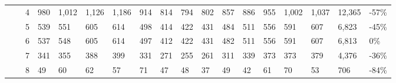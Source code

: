 \begin{longtable}{llllllllllllllllll}
   &  & 4 & 980 & 1,012 & 1,126 & 1,186 & 914 & 814 & 794 & 802 & 857 & 886 & 955 & 1,002 & 1,037 & 12,365 & -57\% \\ 
   &  & 5 & 539 & 551 & 605 & 614 & 498 & 414 & 422 & 431 & 484 & 511 & 556 & 591 & 607 & 6,823 & -45\% \\ 
   &  & 6 & 537 & 548 & 605 & 614 & 497 & 412 & 422 & 431 & 482 & 511 & 556 & 591 & 607 & 6,813 & 0\% \\ 
   &  & 7 & 341 & 355 & 388 & 399 & 331 & 271 & 255 & 261 & 311 & 339 & 373 & 373 & 379 & 4,376 & -36\% \\ 
   &  & 8 & 49 & 60 & 62 & 57 & 71 & 47 & 48 & 37 & 49 & 42 & 61 & 70 & 53 & 706 & -84\% \\ 
  \hline
\end{longtable}
